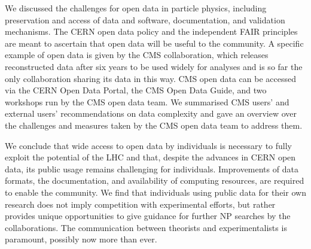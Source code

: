\documentclass[10pt]{article}
\begin{document}
We discussed the challenges for open data in particle physics, including preservation and access of data and software, documentation, and validation mechanisms. 
The CERN open data policy and the independent FAIR principles are meant to ascertain that open data will be useful to the community.
A specific example of open data is given by the CMS collaboration, which releases reconstructed data after six years to be used widely for analyses and is so far the only collaboration sharing its data in this way.
CMS open data can be accessed via the CERN Open Data Portal, the CMS Open Data Guide, and two workshops run by the CMS open data team.
We summarised CMS users' and external users' recommendations on data complexity and gave an overview over the challenges and measures taken by the CMS open data team to address them.

We conclude that wide access to open data by individuals is necessary to fully exploit the potential of the LHC and that, despite the advances in CERN open data, its public usage remains challenging for individuals.
Improvements of data formats, the documentation, and availability of computing resources, are required to enable the community.
We find that individuals using public data for their own research does not imply competition with experimental efforts, but rather provides unique opportunities to give guidance for further NP searches by the collaborations. 
The communication between theorists and experimentalists is paramount, possibly now more than ever. 
\end{document}
